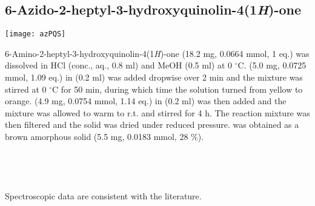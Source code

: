 \subsection{6-Azido-2-heptyl-3-hydroxyquinolin-4(1\textit{H})-one }




\begin{scheme}[H]
	\begin{center}
		\texttt{[image: azPQS]}
	\end{center}
\end{scheme}

6-Amino-2-heptyl-3-hydroxyquinolin-4(1\textit{H})-one  (18.2 mg, 0.0664 mmol, 1 eq.) was dissolved in HCl (conc., aq., 0.8 ml) and MeOH (0.5 ml) at 0 $^{\circ}$C.  (5.0 mg, 0.0725 mmol, 1.09 eq.) in  (0.2 ml) was added dropwise over 2 min and the mixture was stirred at 0 $^{\circ}$C for 50 min, during which time the solution turned from yellow to orange.  (4.9 mg, 0.0754 mmol, 1.14 eq.) in  (0.2 ml) was then added and the mixture was allowed to warm to r.t. and stirred for 4 h. The reaction mixture was then filtered and the solid was dried under reduced pressure.  was obtained as a brown amorphous solid (5.5 mg, 0.0183 mmol, 28 \%).
\\[1\baselineskip]
\\[1\baselineskip]
\\[1\baselineskip]
\\[1\baselineskip]
\\[1\baselineskip]
Spectroscopic data are consistent with the literature\cite{Baker2015}.

